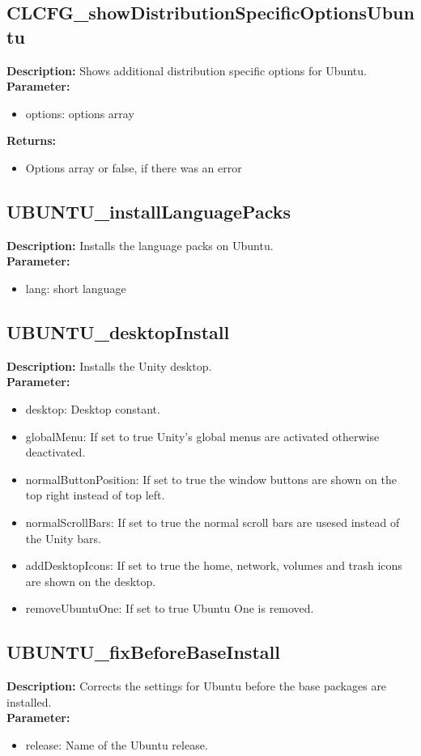 \subsection{CLCFG\_showDistributionSpecificOptionsUbuntu}
\textbf{Description:} Shows additional distribution specific options for Ubuntu.\\
\textbf{Parameter:}
\begin{itemize}
\item options: options array
\end{itemize}
\textbf{Returns:}
\begin{itemize}
\item Options array or false, if there was an error
\end{itemize}

\subsection{UBUNTU\_installLanguagePacks}
\textbf{Description:} Installs the language packs on Ubuntu.\\
\textbf{Parameter:}
\begin{itemize}
\item lang: short language
\end{itemize}

\subsection{UBUNTU\_desktopInstall}
\textbf{Description:} Installs the Unity desktop.\\
\textbf{Parameter:}
\begin{itemize}
\item desktop: Desktop constant.
\item globalMenu: If set to true Unity's global menus are activated otherwise deactivated.
\item normalButtonPosition: If set to true the window buttons are shown on the top right instead of top left.
\item normalScrollBars: If set to true the normal scroll bars are usesed instead of the Unity bars.
\item addDesktopIcons: If set to true the home, network, volumes and trash icons are shown on the desktop.
\item removeUbuntuOne: If set to true Ubuntu One is removed.
\end{itemize}

\subsection{UBUNTU\_fixBeforeBaseInstall}
\textbf{Description:} Corrects the settings for Ubuntu before the base packages are installed.\\
\textbf{Parameter:}
\begin{itemize}
\item release: Name of the Ubuntu release.
\end{itemize}

